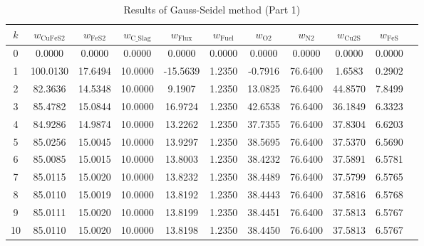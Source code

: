 \documentclass[10pt]{article}
\begin{document}
\begin{table}[H]
\centering
\caption{Results of Gauss-Seidel method (Part 1)}
\begin{tabular}{ccccccccccc}
\toprule
\( k \) & \( w_{\text{CuFeS2}} \) & \( w_{\text{FeS2}} \) & \( w_{\text{C\_Slag}} \) & \( w_{\text{Flux}} \) & \( w_{\text{Fuel}} \) & \( w_{\text{O2}} \) & \( w_{\text{N2}} \) & \( w_{\text{Cu2S}} \) & \( w_{\text{FeS}} \) \\
\midrule
0 & 0.0000 & 0.0000 & 0.0000 & 0.0000 & 0.0000 & 0.0000 & 0.0000 & 0.0000 & 0.0000 \\
1 & 100.0130 & 17.6494 & 10.0000 & -15.5639 & 1.2350 & -0.7916 & 76.6400 & 1.6583 & 0.2902 \\
2 & 82.3636 & 14.5348 & 10.0000 & 9.1907 & 1.2350 & 13.0825 & 76.6400 & 44.8570 & 7.8499 \\
3 & 85.4782 & 15.0844 & 10.0000 & 16.9724 & 1.2350 & 42.6538 & 76.6400 & 36.1849 & 6.3323 \\
4 & 84.9286 & 14.9874 & 10.0000 & 13.2262 & 1.2350 & 37.7355 & 76.6400 & 37.8304 & 6.6203 \\
5 & 85.0256 & 15.0045 & 10.0000 & 13.9297 & 1.2350 & 38.5695 & 76.6400 & 37.5370 & 6.5690 \\
6 & 85.0085 & 15.0015 & 10.0000 & 13.8003 & 1.2350 & 38.4232 & 76.6400 & 37.5891 & 6.5781 \\
7 & 85.0115 & 15.0020 & 10.0000 & 13.8232 & 1.2350 & 38.4489 & 76.6400 & 37.5799 & 6.5765 \\
8 & 85.0110 & 15.0019 & 10.0000 & 13.8192 & 1.2350 & 38.4443 & 76.6400 & 37.5816 & 6.5768 \\
9 & 85.0111 & 15.0020 & 10.0000 & 13.8199 & 1.2350 & 38.4451 & 76.6400 & 37.5813 & 6.5767 \\
10 & 85.0110 & 15.0020 & 10.0000 & 13.8198 & 1.2350 & 38.4450 & 76.6400 & 37.5813 & 6.5767 \\
\bottomrule
\end{tabular}
\end{table}
\end{document}

